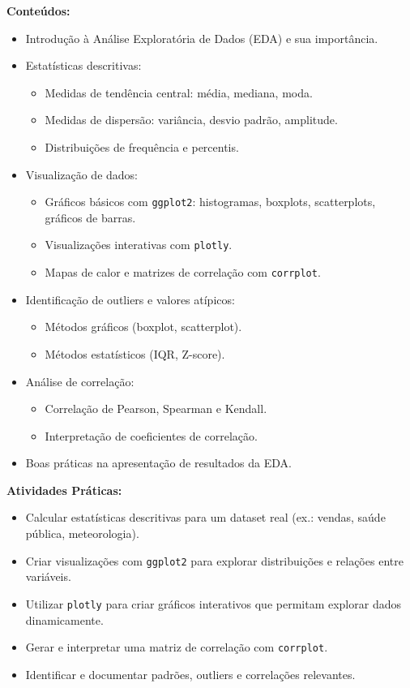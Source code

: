 \documentclass[12pt]{article}
\begin{document}
\textbf{Conteúdos:}
\begin{itemize}
  \item Introdução à Análise Exploratória de Dados (EDA) e sua importância.
  \item Estatísticas descritivas:
    \begin{itemize}
      \item Medidas de tendência central: média, mediana, moda.
      \item Medidas de dispersão: variância, desvio padrão, amplitude.
      \item Distribuições de frequência e percentis.
    \end{itemize}
  \item Visualização de dados:
    \begin{itemize}
      \item Gráficos básicos com \texttt{ggplot2}: histogramas, boxplots, scatterplots, gráficos de barras.
      \item Visualizações interativas com \texttt{plotly}.
      \item Mapas de calor e matrizes de correlação com \texttt{corrplot}.
    \end{itemize}
  \item Identificação de outliers e valores atípicos:
    \begin{itemize}
      \item Métodos gráficos (boxplot, scatterplot).
      \item Métodos estatísticos (IQR, Z-score).
    \end{itemize}
  \item Análise de correlação:
    \begin{itemize}
      \item Correlação de Pearson, Spearman e Kendall.
      \item Interpretação de coeficientes de correlação.
    \end{itemize}
  \item Boas práticas na apresentação de resultados da EDA.
\end{itemize}

\textbf{Atividades Práticas:}
\begin{itemize}
  \item Calcular estatísticas descritivas para um dataset real (ex.: vendas, saúde pública, meteorologia).
  \item Criar visualizações com \texttt{ggplot2} para explorar distribuições e relações entre variáveis.
  \item Utilizar \texttt{plotly} para criar gráficos interativos que permitam explorar dados dinamicamente.
  \item Gerar e interpretar uma matriz de correlação com \texttt{corrplot}.
  \item Identificar e documentar padrões, outliers e correlações relevantes.
\end{itemize}
\end{document}
